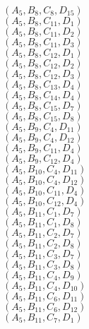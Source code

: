 \documentclass[14pt]{article}
\begin{document}
    $({A}_{5}, {B}_{8}, {C}_{8}, {D}_{15}) $ \\ 
    $({A}_{5}, {B}_{8}, {C}_{11}, {D}_{1}) $ \\ 
    $({A}_{5}, {B}_{8}, {C}_{11}, {D}_{2}) $ \\ 
    $({A}_{5}, {B}_{8}, {C}_{11}, {D}_{3}) $ \\ 
    $({A}_{5}, {B}_{8}, {C}_{12}, {D}_{1}) $ \\ 
    $({A}_{5}, {B}_{8}, {C}_{12}, {D}_{2}) $ \\ 
    $({A}_{5}, {B}_{8}, {C}_{12}, {D}_{3}) $ \\ 
    $({A}_{5}, {B}_{8}, {C}_{13}, {D}_{4}) $ \\ 
    $({A}_{5}, {B}_{8}, {C}_{14}, {D}_{4}) $ \\ 
    $({A}_{5}, {B}_{8}, {C}_{15}, {D}_{7}) $ \\ 
    $({A}_{5}, {B}_{8}, {C}_{15}, {D}_{8}) $ \\ 
    $({A}_{5}, {B}_{9}, {C}_{4}, {D}_{11}) $ \\ 
    $({A}_{5}, {B}_{9}, {C}_{4}, {D}_{12}) $ \\ 
    $({A}_{5}, {B}_{9}, {C}_{11}, {D}_{4}) $ \\ 
    $({A}_{5}, {B}_{9}, {C}_{12}, {D}_{4}) $ \\ 
    $({A}_{5}, {B}_{10}, {C}_{4}, {D}_{11}) $ \\ 
    $({A}_{5}, {B}_{10}, {C}_{4}, {D}_{12}) $ \\ 
    $({A}_{5}, {B}_{10}, {C}_{11}, {D}_{4}) $ \\ 
    $({A}_{5}, {B}_{10}, {C}_{12}, {D}_{4}) $ \\ 
    $({A}_{5}, {B}_{11}, {C}_{1}, {D}_{7}) $ \\ 
    $({A}_{5}, {B}_{11}, {C}_{1}, {D}_{8}) $ \\ 
    $({A}_{5}, {B}_{11}, {C}_{2}, {D}_{7}) $ \\ 
    $({A}_{5}, {B}_{11}, {C}_{2}, {D}_{8}) $ \\ 
    $({A}_{5}, {B}_{11}, {C}_{3}, {D}_{7}) $ \\ 
    $({A}_{5}, {B}_{11}, {C}_{3}, {D}_{8}) $ \\ 
    $({A}_{5}, {B}_{11}, {C}_{4}, {D}_{9}) $ \\ 
    $({A}_{5}, {B}_{11}, {C}_{4}, {D}_{10}) $ \\ 
    $({A}_{5}, {B}_{11}, {C}_{6}, {D}_{11}) $ \\ 
    $({A}_{5}, {B}_{11}, {C}_{6}, {D}_{12}) $ \\ 
    $({A}_{5}, {B}_{11}, {C}_{7}, {D}_{1}) $ \\ 
\end{document}
